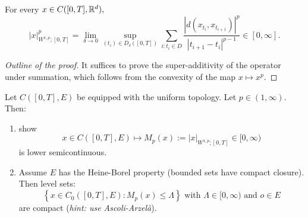 \begin{proposition}
    For every $x \in C([0,T],\mathbb{R}^d),$ 
\begin{equation}
    |x|_{W^{1,p};[0,T]}^p =\lim_{\delta \rightarrow 0} \sup_{(t_i) \in D_\delta ([0,T])} \sum_{i:t_i \in D} \frac{|d(x_{t_i}, x_{t_{i+1}})|^p}{|t_{i+1} - t_i|^{p-1}} \in [0, \infty].
\end{equation}
\end{proposition}
\begin{proof}[Outline of the proof]
    It suffices to prove the super-additivity of the operator under summation, which follows from the convexity of the map $x \mapsto x^p.$
\end{proof}

\begin{example}
    Let $C([0,T], E)$ be equipped with the uniform topology. Let $p \in (1,\infty).$ Then:
    \begin{enumerate}
        \item show
        \begin{equation}
            x \in C([0,T], E) \mapsto M_p(x):= |x|_{W^{1,p};[0,T]} \in [0, \infty) 
        \end{equation}
        is lower semicontinuous.
        \item Assume $E$ has the Heine-Borel property (bounded sets have compact closure). Then level sets:
        \begin{equation}
            \left\{ x \in C_0([0,T], E): M_p(x) \leq \Lambda \right\} \text{ with } \Lambda \in [0, \infty) \text{ and } o \in E
        \end{equation}
        are compact (\textit{hint: use Ascoli-Arzelà}).
    \end{enumerate}
\end{example}
